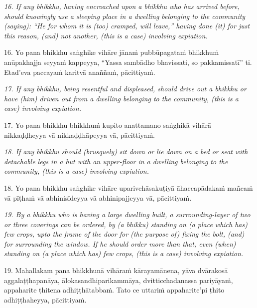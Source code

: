 \documentclass[11pt]{article}
\begin{document}
\begin{paracol}{2}
\begin{column}
{\itshape\footnotesize
16. If any bhikkhu, having encroached upon a bhikkhu who has arrived before, should knowingly use a sleeping place in a dwelling belonging to the community (saying): “He for whom it is (too) cramped, will leave,” having done (it) for just this reason, (and) not another, (this is a case) involving expiation.
}
\switchcolumn

\begin{flushleft}
16. Yo pana bhikkhu saṅghike vihāre jānaṁ pubbūpagataṁ bhikkhuṁ anūpakhajja seyyaṁ kappeyya, “Yassa sambādho bhavissati, so pakkamissatī” ti. Etad’eva paccayaṁ karitvā anaññaṁ, pācittiyaṁ.
\switchcolumn*
\end{flushleft}

{\itshape\footnotesize
17. If any bhikkhu, being resentful and displeased, should drive out a bhikkhu or have (him) driven out from a dwelling belonging to the community, (this is a case) involving expiation.
}
\switchcolumn

\begin{flushleft}
17. Yo pana bhikkhu bhikkhuṁ kupito anattamano saṅghikā vihārā nikkaḍḍheyya vā nikkaḍḍhāpeyya vā, pācittiyaṁ.
\switchcolumn*
\end{flushleft}

{\itshape\footnotesize
18. If any bhikkhu should (brusquely) sit down or lie down on a bed or seat with detachable legs in a hut with an upper-floor in a dwelling belonging to the community, (this is a case) involving expiation.
}
\switchcolumn

\begin{flushleft}
18. Yo pana bhikkhu saṅghike vihāre uparivehāsakuṭiyā āhaccapādakaṁ mañcaṁ vā pīṭhaṁ vā abhinisīdeyya vā abhinipajjeyya vā, pācittiyaṁ.
\switchcolumn*
\end{flushleft}

{\itshape\footnotesize
19. By a bhikkhu who is having a large dwelling built, a surrounding-layer of two or three coverings can be ordered, by (a bhikku) standing on (a place which has) few crops, upto the frame of the door for (the purpose of) fixing the bolt, (and) for surrounding the window. If he should order more than that, even (when) standing on (a place which has) few crops, (this is a case) involving expiation.
}
\switchcolumn

\begin{flushleft}
19. Mahallakam pana bhikkhunā vihāraṁ kārayamānena, yāva dvārakosā aggalaṭṭhapanāya, ālokasandhiparikammāya, dvitticchadanassa pariyāyaṁ, appaharite ṭhitena adhiṭṭhātabbaṁ. Tato ce uttariṁ appaharite’pi ṭhito adhiṭṭhaheyya, pācittiyaṁ.
\switchcolumn*
\end{flushleft}


\end{column}
\end{paracol}
\end{document}
